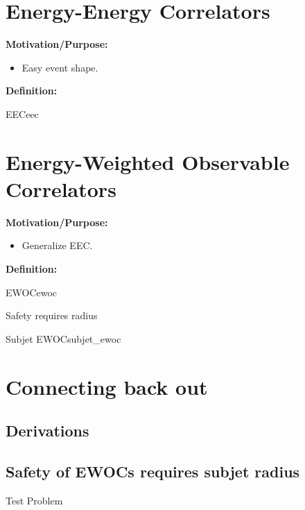 \section{Energy-Energy Correlators}
\begin{sambox}
    \textbf{Motivation/Purpose:}
    \begin{itemize}
        \item
            Easy event shape.
    \end{itemize}

    \textbf{Definition:}
    \begin{definitionbox}{EEC}{eec}
    \end{definitionbox}
\end{sambox}



\section{Energy-Weighted Observable Correlators}
\begin{sambox}
    \textbf{Motivation/Purpose:}
    \begin{itemize}
        \item
            Generalize EEC.
    \end{itemize}

    \textbf{Definition:}
    \begin{definitionbox}{EWOC}{ewoc}
    \end{definitionbox}
    Safety requires radius
    \begin{definitionbox}{Subjet EWOC}{subjet_ewoc}
    \end{definitionbox}
\end{sambox}



\section{Connecting back out}


\begin{subappendices}

\section{Derivations}

\subsection{Safety of EWOCs requires subjet radius}

\end{subappendices}


\begin{problems}
\begin{problem}
    Test Problem
\end{problem}
\end{problems}
